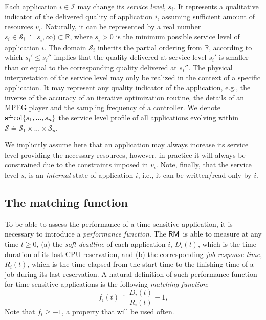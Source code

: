 \documentclass[letter,11pt]{article}
\begin{document}
Each application $i\in\mathcal{I}$ may change its \textit{service level}, $s_i$. It represents a qualitative indicator of the delivered quality of application $i$, assuming sufficient amount of resources $v_i$. Naturally, it can be represented by a real number $s_i\in\mathcal{S}_i{\doteq}[\underline{s}_i,\infty)\subset\mathbb{R}$, where $\underline{s}_i>0$ is the minimum possible service level of application $i$. The domain $\mathcal{S}_i$ inherits the partial ordering from $\mathbb{R}$, according to which $s_i'\leq s_i''$ implies that the quality delivered at service level $s_i'$ is smaller than or equal to the corresponding quality delivered at $s_i''$. The physical interpretation of the service level may only be realized in the context of a specific application. It may represent any quality indicator of the application, e.g., the inverse of the accuracy of an iterative optimization routine, the details of an MPEG player and the sampling frequency of a controller. We denote ${\mathbf{s}}{\doteq}{\rm col}\{s_1,...,s_n\}$ the service level profile of all applications evolving within $\mathcal{S}{\doteq} \mathcal{S}_1\times...\times \mathcal{S}_n$. 

We implicitly assume here that an application may always increase its service level providing the necessary resources, however, in practice it will always be constrained due to the constraints imposed in $v_i$.  Note, finally, that the service level $s_i$ is an \textit{internal} state of application $i$, i.e., it can be written/read only by $i$. 

\subsection{The matching function}
\label{sec:matchFi}

To be able to assess the performance of a time-sensitive application, it is necessary to introduce a \textit{performance function}. The {$\mathsf{RM}$}\ is able to measure at any time $t\geq{0}$, (a) the \emph{soft-deadline} of each application $i$, $D_i(t)$, which is the time duration of its last CPU reservation, and (b) the corresponding \emph{job-response time}, $R_i(t)$, which is the time elapsed from the start time to the finishing time of a job during its last reservation.  A natural definition of such performance function for time-sensitive applications is the following \textit{matching function}:
\begin{equation}
 f_i(t) {\doteq} \frac{D_i(t)}{R_i(t)}-1,
 \label{eq:matching}
\end{equation}
Note that $f_i \geq -1$, a property that will be used often.
\end{document}
